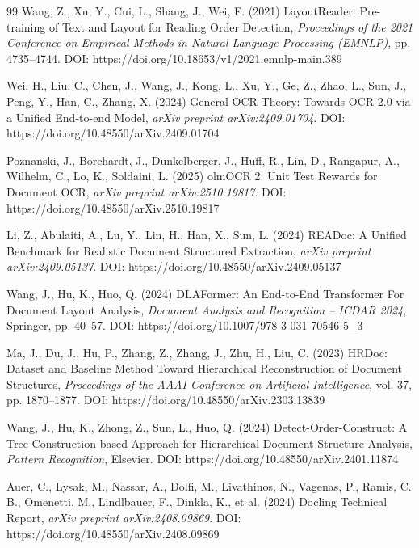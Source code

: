 \documentclass[11pt,twoside]{article}
\begin{document}
\begin{thebibliography}{99}
   Wang, Z., Xu, Y., Cui, L., Shang, J., Wei, F. (2021)
  LayoutReader: Pre-training of Text and Layout for Reading Order Detection,
  {\it Proceedings of the 2021 Conference on Empirical Methods in Natural
  Language Processing (EMNLP)}, pp. 4735--4744.
  DOI: https://doi.org/10.18653/v1/2021.emnlp-main.389

   Wei, H., Liu, C., Chen, J., Wang, J., Kong, L., Xu, Y.,
  Ge, Z., Zhao, L., Sun, J., Peng, Y., Han, C., Zhang, X. (2024) General OCR
  Theory: Towards OCR-2.0 via a Unified End-to-end Model,
  {\it arXiv preprint arXiv:2409.01704}.
  DOI: https://doi.org/10.48550/arXiv.2409.01704

   Poznanski, J., Borchardt, J., Dunkelberger, J., Huff, R.,
  Lin, D., Rangapur, A., Wilhelm, C., Lo, K., Soldaini, L. (2025) olmOCR 2:
  Unit Test Rewards for Document OCR, {\it arXiv preprint arXiv:2510.19817}.
  DOI: https://doi.org/10.48550/arXiv.2510.19817

   Li, Z., Abulaiti, A., Lu, Y., Lin, H., Han, X., Sun, L.
  (2024) READoc: A Unified Benchmark for Realistic Document Structured
  Extraction, {\it arXiv preprint arXiv:2409.05137}.
  DOI: https://doi.org/10.48550/arXiv.2409.05137

   Wang, J., Hu, K., Huo, Q. (2024) DLAFormer: An End-to-End
  Transformer For Document Layout Analysis, {\it Document Analysis and
  Recognition -- ICDAR 2024}, Springer, pp. 40--57.
  DOI: https://doi.org/10.1007/978-3-031-70546-5\_3

   Ma, J., Du, J., Hu, P., Zhang, Z., Zhang, J., Zhu, H.,
  Liu, C. (2023) HRDoc: Dataset and Baseline Method Toward Hierarchical
  Reconstruction of Document Structures, {\it Proceedings of the AAAI Conference
  on Artificial Intelligence}, vol. 37, pp. 1870--1877.
  DOI: https://doi.org/10.48550/arXiv.2303.13839

   Wang, J., Hu, K., Zhong, Z., Sun, L., Huo, Q. (2024)
  Detect-Order-Construct: A Tree Construction based Approach for Hierarchical
  Document Structure Analysis, {\it Pattern Recognition}, Elsevier.
  DOI: https://doi.org/10.48550/arXiv.2401.11874

   Auer, C., Lysak, M., Nassar, A., Dolfi, M., Livathinos, N.,
  Vagenas, P., Ramis, C. B., Omenetti, M., Lindlbauer, F., Dinkla, K., et al.
  (2024) Docling Technical Report, {\it arXiv preprint arXiv:2408.09869}.
  DOI: https://doi.org/10.48550/arXiv.2408.09869


\end{thebibliography}
\end{document}
